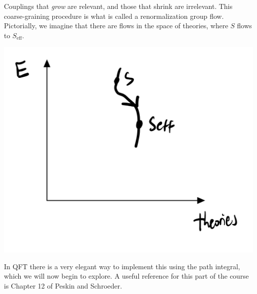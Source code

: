 Couplings that \emph{grow} are relevant, and those that shrink are irrelevant. This coarse-graining procedure is what is called a renormalization group flow. Pictorially, we imagine that there are flows in the space of theories, where $S$ flows to $S_{\text{eff}}$.

\begin{center}
    \includegraphics[scale=0.35]{Lectures/Figures/lec14-rgflow.png}
\end{center}

In QFT there is a very elegant way to implement this using the path integral, which we will now begin to explore. A useful reference for this part of the course is Chapter 12 of Peskin and Schroeder.


